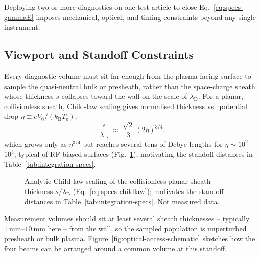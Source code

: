 Deploying two or more diagnostics on one test article to close Eq.~\eqref{eq:specs-gammaE} imposes mechanical, optical, and timing constraints beyond any single instrument.

\subsection{Viewport and Standoff Constraints}

Every diagnostic volume must sit far enough from the plasma-facing surface to sample the quasi-neutral bulk or presheath, rather than the space-charge sheath whose thickness $s$ collapses toward the wall on the scale of $\lambda_{\mathrm{D}}$. For a planar, collisionless sheath, Child-law scaling gives normalised thickness vs.\ potential drop $\eta \equiv eV_{0}/(k_{\mathrm{B}} T_{\mathrm{e}})$,
\begin{equation}
\frac{s}{\lambda_{\mathrm{D}}} \; \approx \; \frac{\sqrt{2}}{3} \, (2\eta)^{3/4} ,
\label{eq:specs-childlaw}
\end{equation}
which grows only as $\eta^{3/4}$ but reaches several tens of Debye lengths for $\eta \sim 10^{2}$--$10^{3}$, typical of RF-biased surfaces (Fig.~\ref{fig:childlaw-sheath}), motivating the standoff distances in Table~\ref{tab:integration-specs}.

\begin{figure}[htbp]
\centering
{}
\caption{Analytic Child-law scaling of the collisionless planar sheath thickness $s/\lambda_{\mathrm{D}}$ (Eq.~\eqref{eq:specs-childlaw}); motivates the standoff distances in Table~\ref{tab:integration-specs}. Not measured data.}
\label{fig:childlaw-sheath}
\end{figure}

Measurement volumes should sit at least several sheath thicknesses -- typically $\SIrange{1}{10}{\milli\meter}$ here -- from the wall, so the sampled population is unperturbed presheath or bulk plasma. Figure~\ref{fig:optical-access-schematic} sketches how the four beams can be arranged around a common volume at this standoff.

